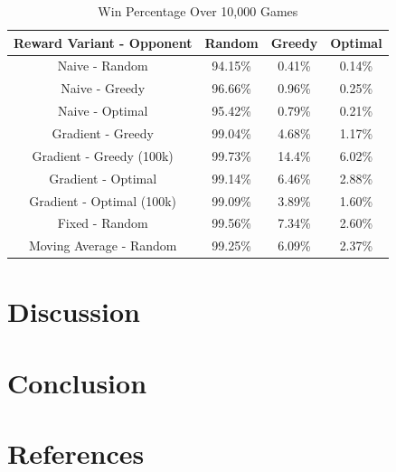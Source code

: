 \documentclass[12pt]{article}
\begin{document}
\begin{table}[H]
    \centering
    \caption*{Win Percentage Over 10,000 Games}
    \begin{tabular}{ |c|c|c|c| }
        \hline
        Reward Variant - Opponent & Random & Greedy & Optimal \\
        \hline
        Naive - Random & 94.15\% & 0.41\% & 0.14\% \\
        Naive - Greedy & 96.66\% & 0.96\% & 0.25\% \\
        Naive - Optimal & 95.42\% & 0.79\% & 0.21\% \\
        Gradient - Greedy & 99.04\% & 4.68\% & 1.17\% \\
        Gradient - Greedy (100k) & 99.73\% & 14.4\% & 6.02\% \\
        Gradient - Optimal & 99.14\% & 6.46\% & 2.88\% \\
        Gradient - Optimal (100k) & 99.09\% & 3.89\% & 1.60\% \\
        Fixed - Random & 99.56\% & 7.34\% & 2.60\% \\
        Moving Average - Random & 99.25\% & 6.09\% & 2.37\% \\
        \hline
    \end{tabular}
\end{table}

\section{Discussion}

\section{Conclusion}


\newpage

\section{References}
\printbibliography[heading=none]
\end{document}
